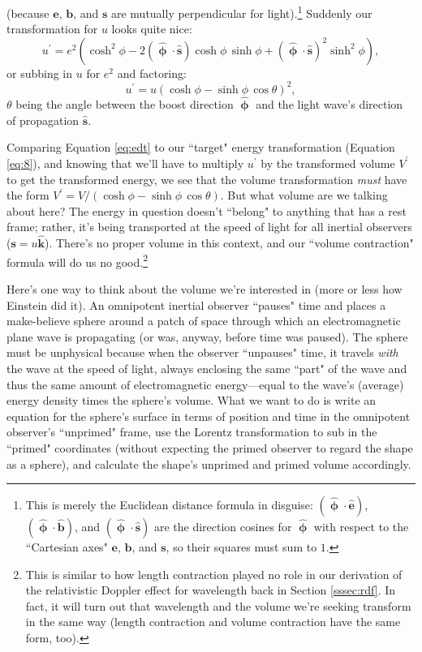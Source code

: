 \documentclass[12pt]{article}
\renewcommand{\vv}[1]{\mathbf{#1}}
\newcommand{\hatphi}{\bm{\hat{\upphi}}}
\begin{document}
(because $\vv e$, $\vv b$, and $\vv s$ are mutually perpendicular for light).\footnote{This is merely the Euclidean distance formula in disguise: $(\hatphi \cdot \vv{\hat e})$, $(\hatphi \cdot \vv{\hat b})$, and $( \hatphi \cdot \vv{\hat s} )$ are the direction cosines for $\hatphi$ with respect to the ``Cartesian axes" $\vv e$, $\vv b$, and $\vv s$, so their squares must sum to $1$.} Suddenly our transformation for $u$ looks quite nice:
\begin{equation*}
u^\prime = e^2 \left( \cosh^2{\phi} - 2 ( \hatphi \cdot \vv{\hat s}) \cosh{\phi} \, \sinh{\phi} + ( \hatphi \cdot \vv{\hat s} )^2 \sinh^2{\phi} \right) ,
\end{equation*}
or subbing in $u$ for $e^2$ and factoring:
\begin{equation}\label{eq:edt}
u^\prime = u \left( \cosh{\phi} - \sinh{\phi} \, \cos{\theta} \right)^2 ,
\end{equation}
$\theta$ being the angle between the boost direction $\hatphi$ and the light wave's direction of propagation $\vv{\hat s}$.

Comparing Equation \ref{eq:edt} to our ``target" energy transformation (Equation \ref{eq:8}), and knowing that we'll have to multiply $u^\prime$ by the transformed volume $V^\prime$ to get the transformed energy, we see that the volume transformation \emph{must} have the form $V^\prime = V / ( \cosh{\phi} - \sinh{\phi} \, \cos{\theta} )$. But what volume are we talking about here? The energy in question doesn't ``belong" to anything that has a rest frame; rather, it's being transported at the speed of light for all inertial observers ($\vv s = u \vv{\hat{k}}$). There's no proper volume in this context, and our ``volume contraction" formula will do us no good.\footnote{This is similar to how length contraction played no role in our derivation of the relativistic Doppler effect for wavelength back in Section \ref{sssec:rdf}. In fact, it will turn out that wavelength and the volume we're seeking transform in the same way (length contraction and volume contraction have the same form, too).}

Here's one way to think about the volume we're interested in (more or less how Einstein did it). An omnipotent inertial observer ``pauses" time and places a make-believe sphere around a patch of space through which an electromagnetic plane wave is propagating (or was, anyway, before time was paused). The sphere must be unphysical because when the observer ``unpauses" time, it travels \emph{with} the wave at the speed of light, always enclosing the same ``part" of the wave and thus the same amount of electromagnetic energy---equal to the wave's (average) energy density times the sphere's volume. What we want to do is write an equation for the sphere's surface in terms of position and time in the omnipotent observer's ``unprimed" frame, use the Lorentz transformation to sub in the ``primed" coordinates (without expecting the primed observer to regard the shape as a sphere), and calculate the shape's unprimed and primed volume accordingly.
\end{document}
